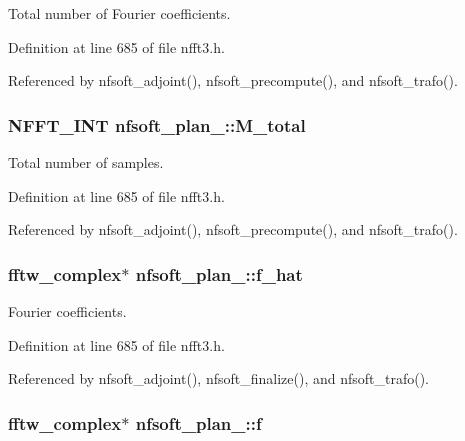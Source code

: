 Total number of Fourier coefficients. 



Definition at line 685 of file nfft3.\-h.



Referenced by nfsoft\-\_\-adjoint(), nfsoft\-\_\-precompute(), and nfsoft\-\_\-trafo().

\hypertarget{structnfsoft__plan___aba4e9aec0273d65dfb761cb51ada2053}{
\subsubsection[{M\-\_\-total}]{\setlength{\rightskip}{0pt plus 5cm}N\-F\-F\-T\-\_\-\-I\-N\-T nfsoft\-\_\-plan\-\_\-\-::\-M\-\_\-total}}\label{structnfsoft__plan___aba4e9aec0273d65dfb761cb51ada2053}


Total number of samples. 



Definition at line 685 of file nfft3.\-h.



Referenced by nfsoft\-\_\-adjoint(), nfsoft\-\_\-precompute(), and nfsoft\-\_\-trafo().

\hypertarget{structnfsoft__plan___a941c8dcaeeef8fed4b55c730d8fbdf80}{
\subsubsection[{f\-\_\-hat}]{\setlength{\rightskip}{0pt plus 5cm}fftw\-\_\-complex$\ast$ nfsoft\-\_\-plan\-\_\-\-::f\-\_\-hat}}\label{structnfsoft__plan___a941c8dcaeeef8fed4b55c730d8fbdf80}


Fourier coefficients. 



Definition at line 685 of file nfft3.\-h.



Referenced by nfsoft\-\_\-adjoint(), nfsoft\-\_\-finalize(), and nfsoft\-\_\-trafo().

\hypertarget{structnfsoft__plan___a68290fc4238315c5cfacd4c0a08ee233}{
\subsubsection[{f}]{\setlength{\rightskip}{0pt plus 5cm}fftw\-\_\-complex$\ast$ nfsoft\-\_\-plan\-\_\-\-::f}}\label{structnfsoft__plan___a68290fc4238315c5cfacd4c0a08ee233}



